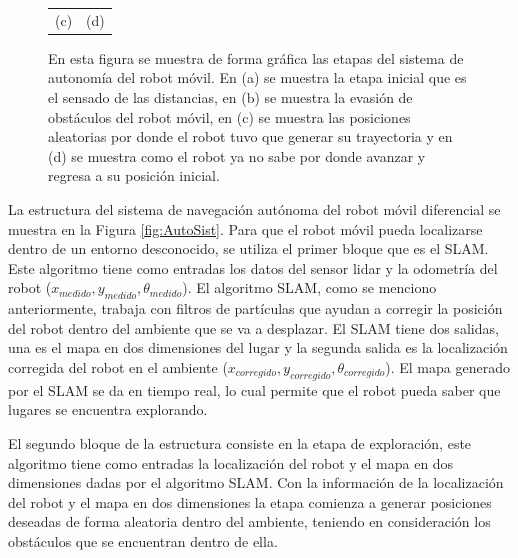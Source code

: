 \begin{figure}[ht!]
\begin{tabular}{cc}
        (c)&(d)
    \end{tabular}
  \captionsetup{font=footnotesize}
    \caption{\label{f:SistemaAutonomo} En esta figura se muestra de forma gráfica las etapas del 
    sistema de autonomía del robot móvil. En (a) se muestra la etapa inicial que es el sensado de 
    las distancias, en (b) se muestra la evasión de obstáculos del robot móvil, en (c) se muestra
    las posiciones aleatorias por donde el robot tuvo que generar su trayectoria y en (d) se muestra
    como el robot ya no sabe por donde avanzar y regresa a su posición inicial.}
\end{figure}

La estructura del sistema de navegación autónoma del robot móvil diferencial se muestra en la
Figura \ref{fig:AutoSist}. Para que el robot móvil pueda localizarse dentro de un entorno 
desconocido, se utiliza el primer bloque que es el SLAM. Este algoritmo tiene como entradas 
los datos del sensor lidar y la odometría del robot ($x_{medido}, y_{medido}, \theta_{medido}$). El
algoritmo SLAM, como se menciono anteriormente, trabaja con filtros de partículas que ayudan 
a corregir la posición del robot dentro del ambiente que se va a desplazar. El SLAM tiene 
dos salidas, una es el mapa en dos dimensiones del lugar y la segunda salida es la localización
corregida del robot en el ambiente ($x_{corregido}, y_{corregido}, \theta_{corregido}$). El mapa
generado por el SLAM se da en tiempo real, lo cual permite que el robot pueda saber que lugares se
encuentra explorando.


El segundo bloque de la estructura consiste en la etapa de exploración, este algoritmo tiene 
como entradas la localización del robot y el mapa en dos dimensiones dadas por el algoritmo
SLAM. Con la información de la localización del robot y el mapa en dos dimensiones la etapa 
comienza a generar posiciones deseadas de forma aleatoria dentro del ambiente, teniendo en 
consideración los obstáculos que se encuentran dentro de ella. 

